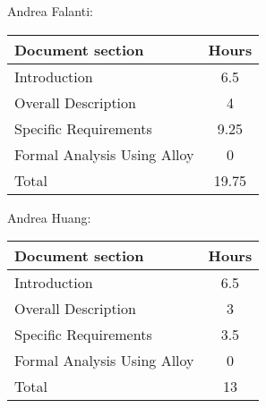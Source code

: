 Andrea Falanti:

\begin{tabular}{|l|c|}
    \hline
    Document section & Hours \\
    \hline
     Introduction & 6.5\\
     Overall Description & 4\\
     Specific Requirements & 9.25\\
     Formal Analysis Using Alloy & 0\\
     \hline
     Total & 19.75\\
     \hline
\end{tabular}
\vskip 0.3in

Andrea Huang:

\begin{tabular}{|l|c|}
    \hline
    Document section & Hours \\
    \hline
     Introduction &  6.5\\
     Overall Description & 3\\
     Specific Requirements & 3.5\\
     Formal Analysis Using Alloy & 0\\
     \hline
     Total & 13\\
     \hline
\end{tabular}